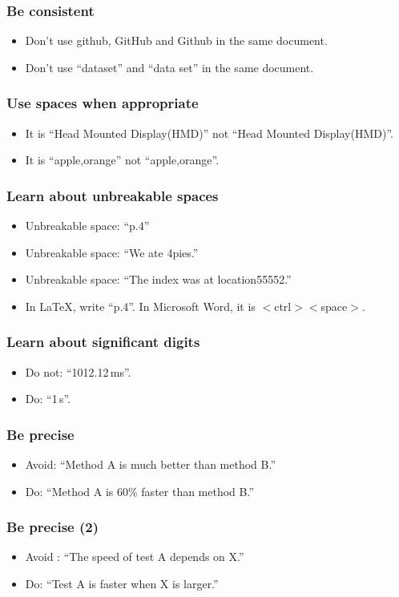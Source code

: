 \documentclass[handout]{beamer}
\begin{document}
\frame
{
  \frametitle{Be consistent}

 \begin{itemize}
  \item<1->  Don't use github, GitHub and Github in the same document.
  \item<2->  Don't use ``dataset'' and ``data set'' in the same document.
 \end{itemize}
 }

\frame
{
  \frametitle{Use spaces when appropriate}

 \begin{itemize}
  \item<1->  It is ``Head Mounted Display(HMD)'' not  ``Head Mounted Display(HMD)''.
  \item<2->  It is ``apple,orange'' not  ``apple,orange''.
 \end{itemize}
 }


\frame
{
  \frametitle{Learn about unbreakable spaces}

 \begin{itemize}
  \item<1->  Unbreakable space: ``p.4''
  \item<2->  Unbreakable space: ``We ate 4pies.''
  \item<2->  Unbreakable space: ``The index was at location55552.''
  \item<3->  In \LaTeX{}, write ``p.\texttildelow{}4''. In Microsoft Word, it is $<$ctrl$><$space$>$.
 \end{itemize}
 }

\frame
{
  \frametitle{Learn about significant digits}

 \begin{itemize}
  \item<1->  Do not: ``1012.12\,ms''.
  \item<2->  Do: ``1\,s''.
 \end{itemize}
 }


\frame
{
  \frametitle{Be precise}
  \begin{itemize}
  \item<1->  Avoid: ``Method A is much better than method B.''
  \item<2->  Do: ``Method A is 60\% faster than method B.''
 \end{itemize}
 }

 \frame
{
  \frametitle{Be precise (2)}
  \begin{itemize}
  \item<1-> Avoid : ``The speed of test A depends on X.''
  \item<2->  Do: ``Test A is faster when X is larger.''
 \end{itemize}
 }
\end{document}

